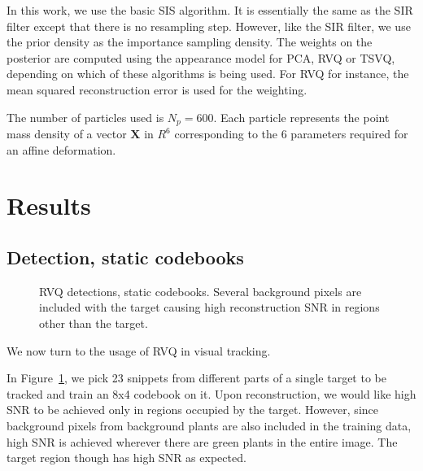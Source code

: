 In this work, we use the basic SIS algorithm.  It is essentially the same as the SIR filter except that there is no resampling step.  However, like the SIR filter, we use the prior density as the importance sampling density.  The weights on the posterior are computed using the appearance model for PCA, RVQ or TSVQ, depending on which of these algorithms is being used.  For RVQ for instance, the mean squared reconstruction error is used for the weighting.

The number of particles used is $N_p=600$.  Each particle represents the point mass density of a vector $\mathbf{X}$ in $R^6$ corresponding to the 6 parameters required for an affine deformation.

\cite{1992_JNL_MCMC_Carlin}
\section{Results}
\subsection{Detection, static codebooks}
								\begin{figure}[t]
								\centering	
								\caption{RVQ detections, static codebooks.  Several background pixels are included with the target causing high reconstruction SNR in regions other than the target.}										
								\label{fig:RVQdet_staticCB_oneTarget}				
								\end{figure}


We now turn to the usage of RVQ in visual tracking.  

In Figure~\ref{fig:RVQdet_staticCB_oneTarget}, we pick 23 snippets from different parts of a single target to be tracked and train an 8x4 codebook on it.  Upon reconstruction, we would like high SNR to be achieved only in regions occupied by the target.  However, since background pixels from background plants are also included in the training data, high SNR is achieved wherever there are green plants in the entire image.  The target region though has high SNR as expected.  

